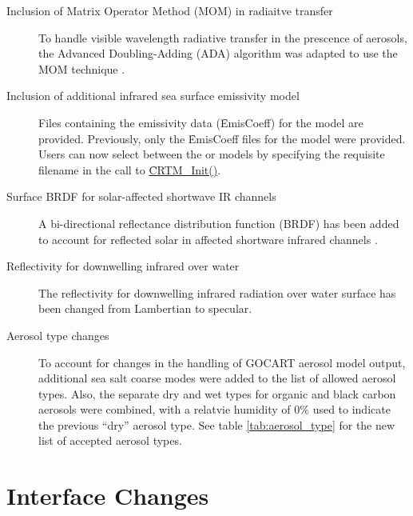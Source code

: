 \begin{description}
\item[Inclusion of Matrix Operator Method (MOM) in radiaitve transfer] To handle visible wavelength radiative transfer in the prescence of aerosols, the Advanced Doubling-Adding (ADA) algorithm was adapted to use the MOM technique \citep{Liu_1996}.

\item[Inclusion of additional infrared sea surface emissivity model] Files containing the emissivity data (\f{EmisCoeff}) for the \citet{Nalli_2008a} model are provided. Previously, only the \f{EmisCoeff} files for the \citet{WuSmith_1997} model were provided. Users can now select between the \citet{Nalli_2008a} or \citet{WuSmith_1997} models by specifying the requisite filename in the call to \hyperref[sec:CRTM_Init_interface]{\f{CRTM\_Init()}}.

\item[Surface BRDF for solar-affected shortwave IR channels] A bi-directional reflectance distribution function (BRDF) has been added to account for reflected solar in affected shortware infrared channels \citep{Breon_1993}.

\item[Reflectivity for downwelling infrared over water] The reflectivity for downwelling infrared  radiation over water surface has been changed from Lambertian to specular.

\item[Aerosol type changes] To account for changes in the handling of GOCART \citep{Chin_2002} aerosol model output, additional sea salt coarse modes were added to the list of allowed aerosol types. Also, the separate dry and wet types for organic and black carbon aerosols were combined, with a relatvie humidity of 0\% used to indicate the previous ``dry'' aerosol type. See table \ref{tab:aerosol_type} for the new list of accepted aerosol types.

\end{description}


\section*{Interface Changes}

